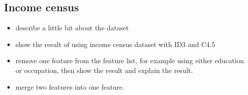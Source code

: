 \documentclass[a4paper]{article}
\begin{document}
\subsection{Income census}

\begin{itemize}
	\item describe a little bit about the dataset
	\item show the result of using income census dataset with ID3 and C4.5
    \item remove one feature from the feature list, for example using either education or occupation, then show the result and explain the result.
    \item merge two features into one feature.
\end{itemize}



\end{document}

